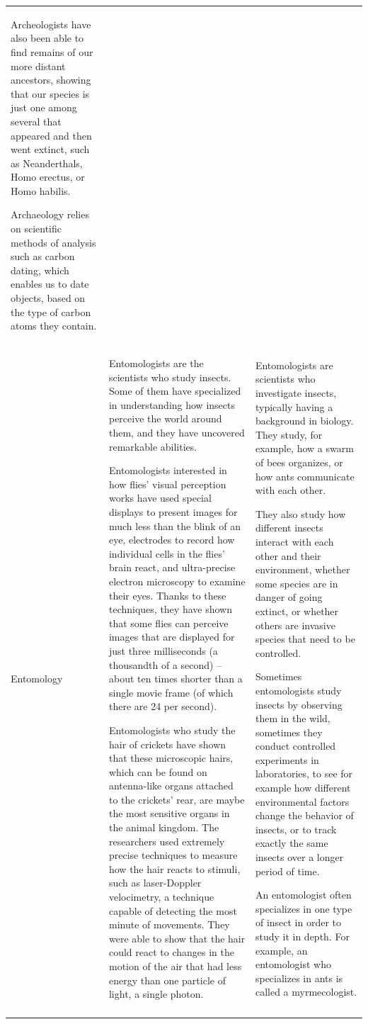 \documentclass[
  english,
  doc,floatsintext]{apa6}
\begin{document}
\begin{longtable}[t]{>{\raggedright\arraybackslash}p{5em}>{\raggedright\arraybackslash}p{25em}>{\raggedright\arraybackslash}p{25em}}
Archeologists have also been able to find remains of our more distant ancestors, showing that our species is just one among several that appeared and then went extinct, such as Neanderthals, Homo erectus, or Homo habilis. 

Archaeology relies on scientific methods of analysis such as carbon dating, which enables us to date objects, based on the type of carbon atoms they contain.\\
Entomology & Entomologists are the scientists who study insects. Some of them have specialized in understanding how insects perceive the world around them, and they have uncovered remarkable abilities. 

Entomologists interested in how flies’ visual perception works have used special displays to present images for much less than the blink of an eye, electrodes to record how individual cells in the flies’ brain react, and ultra-precise electron microscopy to examine their eyes. Thanks to these techniques, they have shown that some flies can perceive images that are displayed for just three milliseconds (a thousandth of a second) – about ten times shorter than a single movie frame (of which there are 24 per second). 

Entomologists who study the hair of crickets have shown that these microscopic hairs, which can be found on antenna-like organs attached to the crickets’ rear, are maybe the most sensitive organs in the animal kingdom. The researchers used extremely precise techniques to measure how the hair reacts to stimuli, such as laser-Doppler velocimetry, a technique capable of detecting the most minute of movements. They were able to show that the hair could react to changes in the motion of the air that had less energy than one particle of light, a single photon. & Entomologists are scientists who investigate insects, typically having a background in biology. They study, for example, how a swarm of bees organizes, or how ants communicate with each other. 

They also study how different insects interact with each other and their environment, whether some species are in danger of going extinct, or whether others are invasive species that need to be controlled.

Sometimes entomologists study insects by observing them in the wild, sometimes they conduct controlled experiments in laboratories, to see for example how different environmental factors change the behavior of insects, or to track exactly the same insects over a longer period of time.

An entomologist often specializes in one type of insect in order to study it in depth. For example, an entomologist who specializes in ants is called a myrmecologist.\\*
\end{longtable}
\endgroup{}
\end{document}
